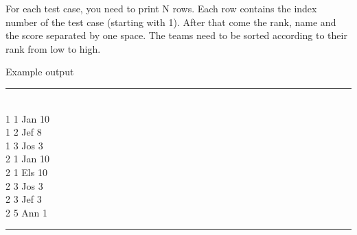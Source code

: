 \documentclass[10pt,a4paper]{article}
\begin{document}
For each test case, you need to print N rows. Each row contains the index number of the test case (starting with 1). After that come the rank, name and the score separated by one space. The teams need to be sorted according to their rank from low to high.


\begin{center}
Example output
\hrule
\end{center}
\mbox{} \\
1 1 Jan 10\\
1 2 Jef 8\\
1 3 Jos 3\\
2 1 Jan 10\\
2 1 Els 10\\
2 3 Jos 3\\
2 3 Jef 3\\
2 5 Ann 1\\
\hrule
\end{document}
